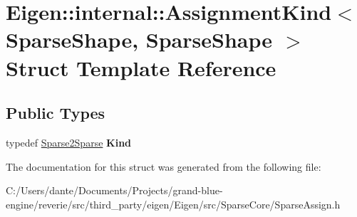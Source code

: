 \hypertarget{struct_eigen_1_1internal_1_1_assignment_kind_3_01_sparse_shape_00_01_sparse_shape_01_4}{}\section{Eigen\+::internal\+::Assignment\+Kind$<$ Sparse\+Shape, Sparse\+Shape $>$ Struct Template Reference}
\label{struct_eigen_1_1internal_1_1_assignment_kind_3_01_sparse_shape_00_01_sparse_shape_01_4}
\subsection*{Public Types}
\begin{DoxyCompactItemize}
\item 
\mbox{\label{struct_eigen_1_1internal_1_1_assignment_kind_3_01_sparse_shape_00_01_sparse_shape_01_4_a3edbf9cc71c05d8e5c3eda23ca95ac63}} 
typedef \mbox{\hyperlink{struct_eigen_1_1internal_1_1_sparse2_sparse}{Sparse2\+Sparse}} {\bfseries Kind}
\end{DoxyCompactItemize}


The documentation for this struct was generated from the following file\+:\begin{DoxyCompactItemize}
\item 
C\+:/\+Users/dante/\+Documents/\+Projects/grand-\/blue-\/engine/reverie/src/third\+\_\+party/eigen/\+Eigen/src/\+Sparse\+Core/Sparse\+Assign.\+h\end{DoxyCompactItemize}
